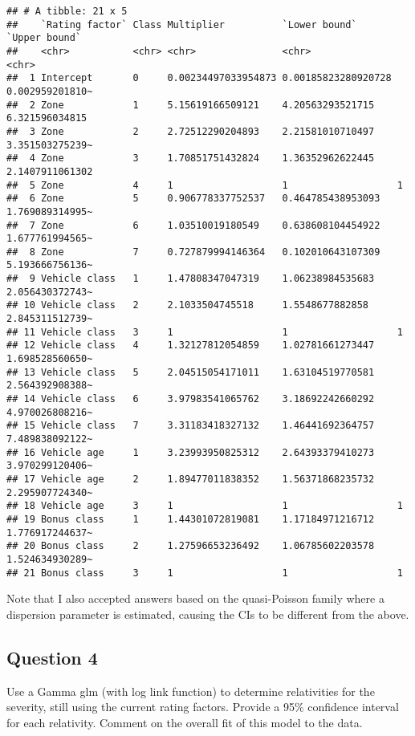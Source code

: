 \documentclass[
]{article}
\begin{document}
\begin{verbatim}
## # A tibble: 21 x 5
##    `Rating factor` Class Multiplier          `Lower bound`       `Upper bound`  
##    <chr>           <chr> <chr>               <chr>               <chr>          
##  1 Intercept       0     0.00234497033954873 0.00185823280920728 0.002959201810~
##  2 Zone            1     5.15619166509121    4.20563293521715    6.321596034815 
##  3 Zone            2     2.72512290204893    2.21581010710497    3.351503275239~
##  4 Zone            3     1.70851751432824    1.36352962622445    2.1407911061302
##  5 Zone            4     1                   1                   1              
##  6 Zone            5     0.906778337752537   0.464785438953093   1.769089314995~
##  7 Zone            6     1.03510019180549    0.638608104454922   1.677761994565~
##  8 Zone            7     0.727879994146364   0.102010643107309   5.193666756136~
##  9 Vehicle class   1     1.47808347047319    1.06238984535683    2.056430372743~
## 10 Vehicle class   2     2.1033504745518     1.5548677882858     2.845311512739~
## 11 Vehicle class   3     1                   1                   1              
## 12 Vehicle class   4     1.32127812054859    1.02781661273447    1.698528560650~
## 13 Vehicle class   5     2.04515054171011    1.63104519770581    2.564392908388~
## 14 Vehicle class   6     3.97983541065762    3.18692242660292    4.970026808216~
## 15 Vehicle class   7     3.31183418327132    1.46441692364757    7.489838092122~
## 16 Vehicle age     1     3.23993950825312    2.64393379410273    3.970299120406~
## 17 Vehicle age     2     1.89477011838352    1.56371868235732    2.295907724340~
## 18 Vehicle age     3     1                   1                   1              
## 19 Bonus class     1     1.44301072819081    1.17184971216712    1.776917244637~
## 20 Bonus class     2     1.27596653236492    1.06785602203578    1.524634930289~
## 21 Bonus class     3     1                   1                   1
\end{verbatim}

Note that I also accepted answers based on the quasi-Poisson family
where a dispersion parameter is estimated, causing the CIs to be
different from the above.

\hypertarget{question-4}{%
\subsection{Question 4}\label{question-4}}

Use a Gamma glm (with log link function) to determine relativities for
the severity, still using the current rating factors. Provide a 95\%
confidence interval for each relativity. Comment on the overall fit of
this model to the data.
\end{document}
